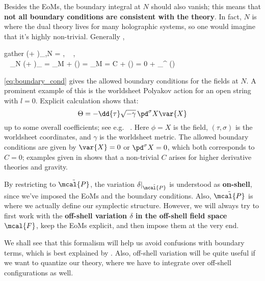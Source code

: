\documentclass[a4paper
	,10pt
]{article}
\begin{document}
	Besides the EoMs, the boundary integral at $N$ should also vanish; this means that \textbf{not all boundary conditions are consistent with the theory}. 
	In fact, $N$ is where the dual theory lives for many holographic systems, so one would imagine that it's highly non-trivial. Generally \cite{Harlow:2019yfa},
	\begin{empheq}{gather}
		(\Theta + )_{,N}
		= ,
	\quad
		\colon\ %
		,
	\label{eq:boundary_cond}
	\\
	\Longrightarrow\ %
		\int_{N} (\Theta + )_{}
		= \int_{\pd M} 
			+ ({\cdots})
		= \int_{\pd \pd M = \varnothing} C
			+ ({\cdots})
		= 0
			+ \int_{\Sigma^\pm} ({\cdots})
	\end{empheq}
	
	\eqref{eq:boundary_cond} gives the allowed boundary conditions for the fields at $N$. A prominent example of this is the worldsheet Polyakov action for an open string with $l = 0$. Explicit calculation shows that:
	\begin{equation}
		\Theta = - \dd{\tau} \sqrt{-\gamma}\,
			\pd^\sigma X \var{X}
	\end{equation}
	up to some overall coefficients; see e.g.~\textsl{\citeauthor{Polchinski:1998rq}} \cite{Polchinski:1998rq}. Here $\phi = X$ is the field, $(\tau,\sigma)$ is the worldsheet coordinates, and $\gamma$ is the worldsheet metric. The allowed boundary conditions are given by $\var{X} = 0$ or $\pd^\sigma X = 0$, which both corresponds to $C = 0$; examples given in \cite{Harlow:2019yfa} shows that a non-trivial $C$ arises for higher derivative theories and gravity. 
	
	By restricting to $\tilde{\mcal{P}}$, the variation $\delta|_{\tilde{\mcal{P}}}$ is understood as \textbf{on-shell}, since we've imposed the EoMs and the boundary conditions. Also, $\tilde{\mcal{P}}$ is where we actually define our symplectic structure. However, we will always try to first work with the \textbf{off-shell variation $\delta$ in the off-shell field space $\mcal{F}$}, keep the EoMs explicit, and then impose them at the very end. 
	
	We shall see that this formalism will help us avoid confusions with boundary terms, which is best explained by \textcite{Banados:2016zim}. Also, off-shell variation will be quite useful if we want to quantize our theory, where we have to integrate over off-shell configurations as well. 
\end{document}
